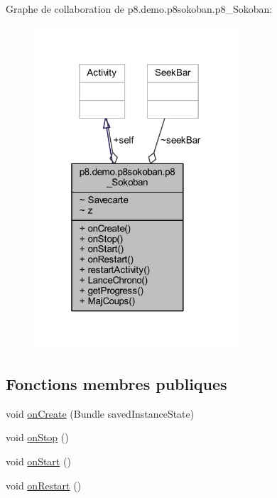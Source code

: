 Graphe de collaboration de p8.\+demo.\+p8sokoban.\+p8\+\_\+\+Sokoban\+:
\nopagebreak
\begin{figure}[H]
\begin{center}
\leavevmode
\includegraphics[width=217pt]{classp8_1_1demo_1_1p8sokoban_1_1p8___sokoban__coll__graph}
\end{center}
\end{figure}
\subsection*{Fonctions membres publiques}
\begin{DoxyCompactItemize}
\item 
void \hyperlink{classp8_1_1demo_1_1p8sokoban_1_1p8___sokoban_a4b9ef11394d277a9323ba41d191ebeaf}{on\+Create} (Bundle saved\+Instance\+State)
\item 
void \hyperlink{classp8_1_1demo_1_1p8sokoban_1_1p8___sokoban_a6b060c50b17932ba603624c5f2205344}{on\+Stop} ()
\item 
void \hyperlink{classp8_1_1demo_1_1p8sokoban_1_1p8___sokoban_af5bb8babf3e17336459cb12758eed269}{on\+Start} ()
\item 
void \hyperlink{classp8_1_1demo_1_1p8sokoban_1_1p8___sokoban_a8171d8ea7b1d39ab41354642f6d78534}{on\+Restart} ()
\end{DoxyCompactItemize}

